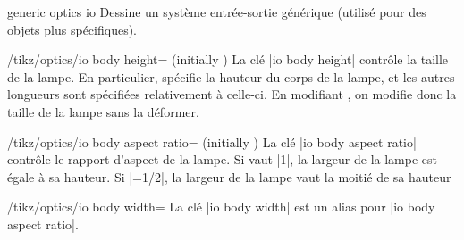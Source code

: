 \documentclass[a4paper]{ltxdoc}
\begin{document}
\begin{shape}{generic optics io}
Dessine un système entrée-sortie générique (utilisé pour des objets plus spécifiques).

\begin{codeexample}[width=6cm]
\end{codeexample}


\begin{key}{/tikz/optics/io body height= (initially )}
    La clé |io body height| contrôle la taille de la lampe. En particulier,  spécifie la hauteur du corps de la lampe,
    et les autres longueurs sont spécifiées relativement à celle-ci. En modifiant , on modifie donc la taille de la lampe
    sans la déformer.  

    \begin{codeexample}[]
    \end{codeexample}
\end{key}

\begin{key}{/tikz/optics/io body aspect ratio= (initially )}
    La clé |io body aspect ratio| contrôle le rapport d'aspect de la lampe. Si  vaut |1|, la largeur de la lampe est égale à sa hauteur.
    Si |=1/2|, la largeur de la lampe vaut la moitié de sa hauteur

    \begin{codeexample}[]
    \end{codeexample}
\end{key}

\begin{stylekey}{/tikz/optics/io body width=}
La clé |io body width| est un alias pour |io body aspect ratio|.
\end{stylekey}



\end{shape}
\end{document}
